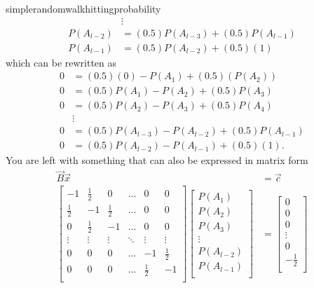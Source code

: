 \begin{answer}{simplerandomwalkhittingprobability}
\begin{align*}
 & \vdots \\
P(A_{l-2}) &= (0.5) P(A_{l-3})  + (0.5) P(A_{l-1})  \\
P(A_{l-1}) &= (0.5) P(A_{l-2})  + (0.5)(1)
\end{align*}
which can be rewritten as
\begin{align*}
0 &= (0.5)(0) - P(A_1)   + (0.5)(P(A_2)) \\
0 &= (0.5) P(A_1)  - P(A_2)  + (0.5) P(A_3)  \\
0 &= (0.5) P(A_2)  - P(A_3)  + (0.5) P(A_4)  \\
  & \vdots \\
0 &= (0.5) P(A_{l-3})  - P(A_{l-2}) + (0.5) P(A_{l-1}) \\
0 &= (0.5) P(A_{l-2})  - P(A_{l-1}) + (0.5)(1)
\text{.}
\end{align*}
You are left with something that can also be expressed in matrix form
\begin{align*}
\vec{B}\vec{x} &= \vec{c} \\
  \begin{bmatrix}
 -1           & \frac{1}{2}  & 0            &   \ldots       & 0            & 0            \\
 \frac{1}{2}  & -1           & \frac{1}{2}  &   \ldots       & 0            & 0            \\
 0            & \frac{1}{2}  & -1           &   \ldots       & 0            & 0            \\
  \vdots      & \vdots       & \vdots       &   \ddots       & \vdots       & \vdots       \\
 0            & 0            & 0            &   \ldots       & -1           & \frac{1}{2}  \\
 0            & 0            & 0            &   \ldots       & \frac{1}{2}  & -1           \\
  \end{bmatrix}
  \begin{bmatrix}
  P(A_1) \\
  P(A_2) \\
  P(A_3) \\
  \vdots \\
  P(A_{l-2}) \\
  P(A_{l-1}) \\
  \end{bmatrix}
  &=
  \begin{bmatrix}
    0 \\ 0 \\ 0 \\ \vdots \\ 0 \\ -\frac{1}{2} \\

\end{bmatrix}
\end{align*}
\end{answer}

